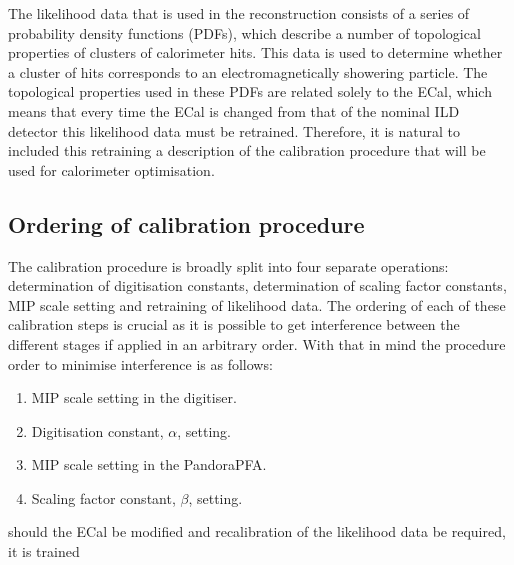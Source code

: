 The likelihood data that is used in the reconstruction consists of a series of probability density functions (PDFs), which describe a number of topological properties of clusters of calorimeter hits.  This data is used to determine whether a cluster of hits corresponds to an electromagnetically showering particle.  The topological properties used in these PDFs are related solely to the ECal, which means that every time the ECal is changed from that of the nominal ILD detector this likelihood data must be retrained.  Therefore, it is natural to included this retraining a description of the calibration procedure that will be used for calorimeter optimisation.



\subsection{Ordering of calibration procedure}
The calibration procedure is broadly split into four separate operations: determination of digitisation constants, determination of scaling factor constants, MIP scale setting and retraining of likelihood data.  The ordering of each of these calibration steps is crucial as it is possible to get interference between the different stages if applied in an arbitrary order.  With that in mind the procedure order to minimise interference is as follows:

\begin{enumerate} 
\item MIP scale setting in the digitiser.
\item Digitisation constant, $\alpha$, setting.
\item MIP scale setting in the PandoraPFA.
\item Scaling factor constant, $\beta$, setting.
\end{enumerate} 

\noindent should the ECal be modified and recalibration of the likelihood data be required, it is trained 



